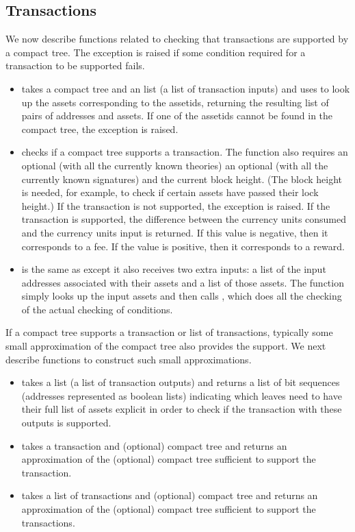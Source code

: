\subsection{Transactions}

We now describe functions related to checking that transactions
are supported by a compact tree.
The exception {} is raised if
some condition required for a transaction to be supported fails.
\begin{itemize}
\item {} takes a compact tree and an
{} list (a list of transaction inputs)
and uses {} to look up the assets corresponding to
the assetids, returning the resulting list of pairs of addresses and assets.
If one of the assetids cannot be found in the compact tree,
the exception {} is raised.
\item {} checks if a compact tree supports a transaction.
The function also requires an optional {} (with all the currently known theories)
an optional {} (with all the currently known signatures)
and the current block height. (The block height is needed, for example, to check
if certain assets have passed their lock height.)
If the transaction is not supported, the exception {} is raised.
If the transaction is supported,
the difference between the currency units consumed and the currency units input
is returned. If this value is negative, then it corresponds to a fee.
If the value is positive, then it corresponds to a reward.
\item {} is the same as {}
except it also receives two extra inputs:
a list of the input addresses associated with their assets
and a list of those assets.
The function {} simply looks up the input assets and then calls {}, which does all the checking of the actual checking of conditions.
\end{itemize}

If a compact tree supports a transaction or list of transactions,
typically some small approximation of the compact tree also provides the support.
We next describe functions to construct such small approximations.
\begin{itemize}
\item {} takes a {} list (a list of transaction outputs)
and returns a list of bit sequences (addresses represented as boolean lists)
indicating which leaves need to have their full list of assets explicit
in order to check if the transaction with these outputs
is supported. 
\item {} takes a transaction and (optional) compact tree
and returns an approximation of the (optional) compact tree sufficient to support the transaction.
\item {} takes a list of transactions and (optional) compact tree
and returns an approximation of the (optional) compact tree sufficient to support the transactions.
\end{itemize}

